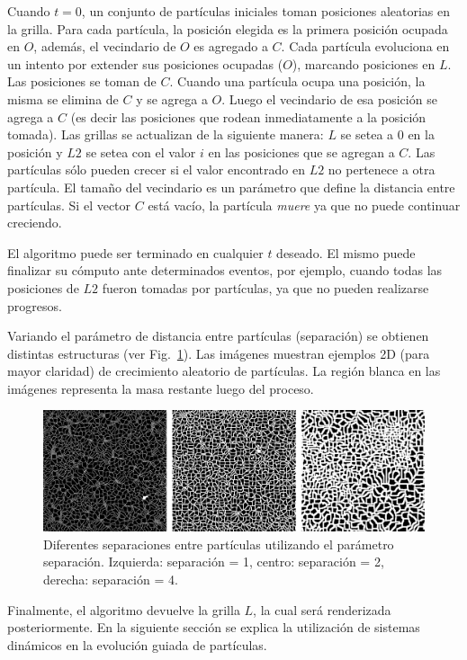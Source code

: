 \documentclass[spanish,a4paper,11pt,oneside,links]{report}
\begin{document}
Cuando $t = 0$, un conjunto de part\'iculas iniciales toman posiciones aleatorias en la grilla. Para cada partícula, la posici\'on elegida es la primera posici\'on ocupada en $O$, adem\'as, el vecindario de $O$ es agregado a $C$. Cada part\'icula evoluciona en un intento por extender sus posiciones ocupadas ($O$), marcando posiciones en $L$. Las posiciones se toman de $C$. Cuando una part\'icula ocupa una posici\'on, la misma se elimina de $C$ y se agrega a $O$. Luego el vecindario de esa posici\'on se agrega a $C$ (es decir las posiciones que rodean inmediatamente a la posici\'on tomada). Las grillas se actualizan de la siguiente manera: $L$ se setea a $0$ en la posici\'on y $L2$ se setea con el valor $i$ en las posiciones que se agregan a $C$. Las part\'iculas s\'olo pueden crecer si el valor encontrado en $L2$ no pertenece a otra part\'icula. El tama\~no del vecindario es un par\'ametro que define la distancia entre part\'iculas. Si el vector $C$ est\'a vac\'io, la part\'icula {\em muere} ya que no puede continuar creciendo.


El algoritmo puede ser terminado en cualquier $t$ deseado. El mismo puede finalizar su c\'omputo ante determinados eventos, por ejemplo, cuando todas las posiciones de $L2$ fueron tomadas por part\'iculas, ya que no pueden realizarse progresos.

Variando el par\'ametro de distancia entre part\'iculas (separación) se obtienen distintas estructuras (ver Fig.~\ref{fg:sistdin1}). Las im\'agenes muestran ejemplos 2D (para mayor claridad) de crecimiento aleatorio de part\'iculas. La regi\'on blanca en las im\'agenes representa la masa restante luego del proceso.


\begin{figure}[htb!]
  \centerline{\includegraphics[scale=0.22]{sistdin1}}
  \caption{Diferentes separaciones entre part\'iculas utilizando el par\'ametro separación. Izquierda: separaci\'on = 1, centro: separaci\'on = 2, derecha: separaci\'on = 4.}
  \label{fg:sistdin1}
\end{figure}

Finalmente, el algoritmo devuelve la grilla $L$, la cual ser\'a renderizada posteriormente. En la siguiente secci\'on se explica la utilizaci\'on de sistemas din\'amicos en la evoluci\'on guiada de part\'iculas.
\end{document}
